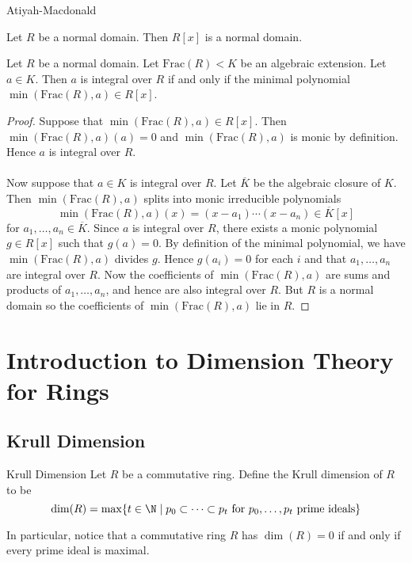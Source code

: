 \documentclass[a4paper]{article}
\begin{document}
Atiyah-Macdonald

\begin{prp}{}{} Let $R$ be a normal domain. Then $R[x]$ is a normal domain. 
\end{prp}

\begin{prp}{}{} Let $R$ be a normal domain. Let $\text{Frac}(R)<K$ be an algebraic extension. Let $a\in K$. Then $a$ is integral over $R$ if and only if the minimal polynomial $\min(\text{Frac}(R),a)\in R[x]$. \tcbline
\begin{proof}
Suppose that $\min(\text{Frac}(R),a)\in R[x]$. Then $\min(\text{Frac}(R),a)(a)=0$ and $\min(\text{Frac}(R),a)$ is monic by definition. Hence $a$ is integral over $R$. \\~\\

Now suppose that $a\in K$ is integral over $R$. Let $\overline{K}$ be the algebraic closure of $K$. Then $\min(\text{Frac}(R),a)$ splits into monic irreducible polynomials $$\min(\text{Frac}(R),a)(x)=(x-a_1)\cdots(x-a_n)\in\overline{K}[x]$$ for $a_1,\dots,a_n\in\overline{K}$. Since $a$ is integral over $R$, there exists a monic polynomial $g\in R[x]$ such that $g(a)=0$. By definition of the minimal polynomial, we have $\min(\text{Frac}(R),a)$ divides $g$. Hence $g(a_i)=0$ for each $i$ and that $a_1,\dots,a_n$ are integral over $R$. Now the coefficients of $\min(\text{Frac}(R),a)$ are sums and products of $a_1,\dots,a_n$, and hence are also integral over $R$. But $R$ is a normal domain so the coefficients of $\min(\text{Frac}(R),a)$ lie in $R$. 
\end{proof}
\end{prp}

\pagebreak
\section{Introduction to Dimension Theory for Rings}
\subsection{Krull Dimension}
\begin{defn}{Krull Dimension}{} Let $R$ be a commutative ring. Define the Krull dimension of $R$ to be $$\dim(R)=\max\{t\in\N\;|\;p_0\subset\dots\subset p_t\text{ for }p_0,\dots,p_t\text{ prime ideals}\}$$
\end{defn}

In particular, notice that a commutative ring $R$ has $\dim(R)=0$ if and only if every prime ideal is maximal. 
\end{document}
